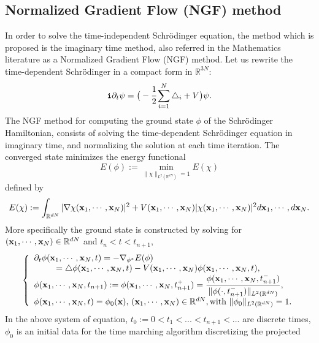 \documentclass[11pt]{elsarticle}
\newcommand{\R} {\ensuremath{\mathbb{R}}}
\begin{document}
\subsection{Normalized Gradient Flow (NGF) method}\label{ITM}
In order to solve the time-independent Schr\"odinger equation, the method which is proposed is the imaginary time method, also referred in the Mathematics literature as a Normalized Gradient Flow (NGF) method. Let us rewrite the time-dependent Schr\"odinger in a compact form in $\R^{3N}$:
\begin{eqnarray}\label{LG}
{\tt i}\partial_t \psi = \big(-\cfrac{1}{2}\sum_{i=1}^N\triangle_i+V\big)\psi.
\end{eqnarray}
The NGF method for computing the ground state $\phi$ of the Schr\"odinger Hamiltonian, consists of solving the time-dependent Schr\"odinger equation in imaginary time, and normalizing the solution at each time iteration. The converged state minimizes the energy functional
$$E(\phi):=\min_{\|\chi \|_{L^{2}(\mathbb{R}^{dN})}=1}E(\chi)$$ 
defined by 
\begin{equation}\label{dennrj}
E(\chi):=\int_{ \R^{dN}}|\nabla \chi({\bf x}_1,\cdots,{\bf x}_N)|^2+V({\bf x}_1,\cdots,{\bf x}_N)|\chi({\bf x}_1,\cdots,{\bf x}_N)|^2d{\bf x}_1,\cdots,d{\bf x}_N.
\end{equation}
More specifically the ground state is constructed by solving for $({\bf x}_1,\cdots,{\bf x}_N) \in  \R^{dN}$ and $t_{n}< t <t_{n+1}$,
\begin{eqnarray}\label{e1bis}
\left\{
\begin{array}{l}
\partial_t \phi({\bf x}_1,\cdots,{\bf x}_N,t) = -\nabla_{\phi^{*}}E(\phi) \\ \hspace{0.9cm} =\triangle \phi({\bf x}_1,\cdots,{\bf x}_N,t) - V({\bf x}_1,\cdots,{\bf x}_N)\phi({\bf x}_1,\cdots,{\bf x}_N,t), \\
\displaystyle \phi({\bf x}_1,\cdots,{\bf x}_N,t_{n+1}):=\phi({\bf x}_1,\cdots,{\bf x}_N,t^{+}_{n+1})=\frac{\phi({\bf x}_1,\cdots,{\bf x}_N,t^{-}_{n+1})}{\| \phi(\cdot ,t^{-}_{n+1})\|_{L^{2}(\mathbb{R}^{dN})}},\\
\phi({\bf x}_1,\cdots,{\bf x}_N,t)=\phi_0({\bf x}), \, ({\bf x}_1,\cdots,{\bf x}_N) \in  \R^{dN}, \textrm{with $\|\phi_{0} \|_{L^{2}(\mathbb{R}^{dN})}=1$.}
\end{array}
\right.
\end{eqnarray} 
In the above system of equation, $t_{0}:=0<t_{1}<...<t_{n+1}<...$ are discrete times, $\phi_{0}$ is an initial data for the time marching algorithm discretizing the projected
\end{document}
